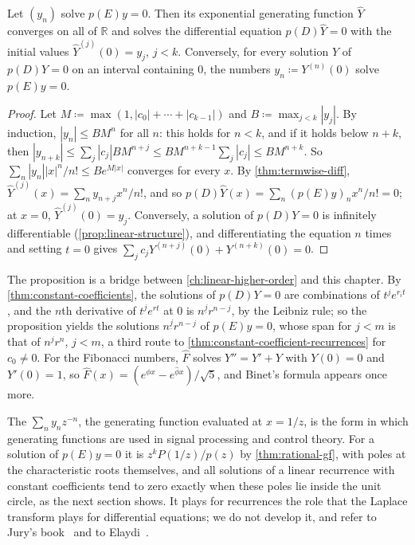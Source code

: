 \begin{proposition}
\label{prop:egf-recurrence}
Let $(y_n)$ solve $p(E)y=0$. Then its exponential generating function $\hat Y$ converges on all of $\mathbb R$ and solves the differential equation $p(D)\hat Y=0$ with the initial values $\hat Y^{(j)}(0)=y_j$, $j<k$. Conversely, for every solution $Y$ of $p(D)Y=0$ on an interval containing $0$, the numbers $y_n\coloneqq Y^{(n)}(0)$ solve $p(E)y=0$.
\end{proposition}

\begin{proof}
Let $M\coloneqq\max(1,|c_0|+\cdots+|c_{k-1}|)$ and $B\coloneqq\max_{j<k}|y_j|$. By induction, $|y_n|\le BM^n$ for all $n$: this holds for $n<k$, and if it holds below $n+k$, then $|y_{n+k}|\le\sum_j|c_j|BM^{n+j}\le BM^{n+k-1}\sum_j|c_j|\le BM^{n+k}$. So $\sum_n|y_n||x|^n/n!\le Be^{M|x|}$ converges for every $x$. By \cref{thm:termwise-diff}, $\hat Y^{(j)}(x)=\sum_ny_{n+j}x^n/n!$, and so $p(D)\hat Y(x)=\sum_n(p(E)y)_nx^n/n!=0$; at $x=0$, $\hat Y^{(j)}(0)=y_j$. Conversely, a solution of $p(D)Y=0$ is infinitely differentiable (\cref{prop:linear-structure}), and differentiating the equation $n$ times and setting $t=0$ gives $\sum_jc_jY^{(n+j)}(0)+Y^{(n+k)}(0)=0$.
\end{proof}

The proposition is a bridge between \cref{ch:linear-higher-order} and this chapter. By \cref{thm:constant-coefficients}, the solutions of $p(D)Y=0$ are combinations of $t^je^{r_it}$, and the $n$th derivative of $t^je^{rt}$ at $0$ is $n^{\underline j}r^{n-j}$, by the Leibniz rule; so the proposition yields the solutions $n^{\underline j}r^{n-j}$ of $p(E)y=0$, whose span for $j<m$ is that of $n^jr^n$, $j<m$, a third route to \cref{thm:constant-coefficient-recurrences} for $c_0\ne0$. For the Fibonacci numbers, $\hat F$ solves $Y''=Y'+Y$ with $Y(0)=0$ and $Y'(0)=1$, so $\hat F(x)=(e^{\phi x}-e^{\hat\phi x})/\sqrt5$, and Binet's formula appears once more.

The  $\sum_ny_nz^{-n}$, the generating function evaluated at $x=1/z$, is the form in which generating functions are used in signal processing and control theory. For a solution of $p(E)y=0$ it is $z^kP(1/z)/p(z)$ by \cref{thm:rational-gf}, with poles at the characteristic roots themselves, and all solutions of a linear recurrence with constant coefficients tend to zero exactly when these poles lie inside the unit circle, as the next section shows. It plays for recurrences the role that the Laplace transform plays for differential equations; we do not develop it, and refer to Jury's book~\cite{jury1964} and to Elaydi~\cite[Chap.~6]{elaydi2005}.

